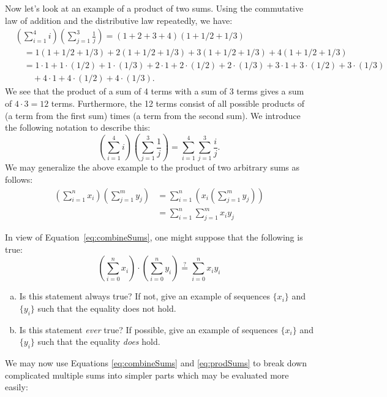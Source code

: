 Now let's look at an example of a product of two sums. 
Using the commutative law of addition and the distributive law repeatedly, we have:
\begin{align*}
& \left(\sum_{i=1}^4 i\right)\left(\sum_{j=1}^3 \frac{1}{j}\right)  = (1+2+3+4)(1 + 1/2 + 1/3) \\
&\quad = 1(1 + 1/2 + 1/3) + 2(1 + 1/2 + 1/3) + 3(1 + 1/2 + 1/3) + 4(1 + 1/2 + 1/3) \\
&\quad = 1\cdot 1 + 1\cdot (1/2) + 1 \cdot (1/3) + 2 \cdot 1 + 2 \cdot (1/2) + 2 \cdot (1/3) + 3 \cdot 1 + 3 \cdot (1/2) + 3 \cdot (1/3) \\
& \qquad + 4 \cdot 1 + 4 \cdot (1/2) + 4 \cdot (1/3).
\end{align*}
We see that the product of a sum of 4 terms with a sum of 3 terms gives a sum of $4\cdot 3 = 12$ terms. Furthermore, the 12 terms consist of all possible products of (a term from the first sum) times (a term from the second sum). We introduce the following notation to describe this:
\[ \left(\sum_{i=1}^4 i\right)\left(\sum_{j=1}^3 \frac{1}{j}\right) = \sum_{i=1}^4\sum_{j=1}^3 \frac{i}{j}. \]
We may generalize the above example to the product of two arbitrary sums as follows:
\begin{equation}\label{eq:prodSums}
\begin{aligned}
\left(\sum_{i=1}^n x_i\right)\left(\sum_{j=1}^m y_j\right)  &= \sum_{i=1}^n \left( x_i\left(\sum_{j=1}^m y_j\right)\right) \\
&=  \sum_{i=1}^n \sum_{j=1}^m x_i y_j
\end{aligned}    
\end{equation}

\begin{exercise}{}
In view of Equation~\eqref{eq:combineSums}, one might suppose that the following is true:
\[ \left(\sum_{i=0}^n x_i \right) \cdot  \left(  \sum_{i=0}^n y_i \right)
\stackrel{?}{=} \sum_{i=0}^n x_i y_i 
\]
\begin{enumerate}[(a)]
\item
Is this statement always true? If not, give an example of sequences $\{x_i\}$ and $\{y_i\}$ such that the equality does not hold.
\item
Is this statement \emph{ever} true? If possible, give an example of sequences $\{x_i\}$ and $\{y_i\}$ such that the equality \emph{does} hold.
\end{enumerate}
\end{exercise}

We may now use Equations \eqref{eq:combineSums} and \eqref{eq:prodSums} to break down complicated multiple sums into simpler parts which may be evaluated more easily:

